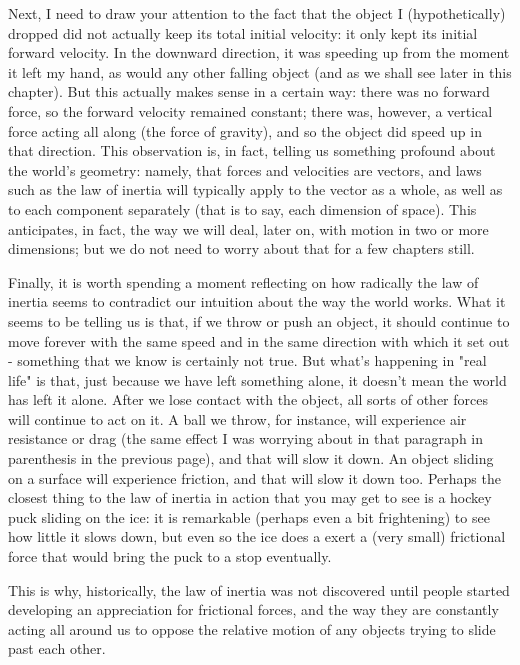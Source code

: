 \documentclass[10pt]{article}
\begin{document}
Next, I need to draw your attention to the fact that the object I (hypothetically) dropped did not actually keep its total initial velocity: it only kept its initial forward velocity. In the downward direction, it was speeding up from the moment it left my hand, as would any other falling object (and as we shall see later in this chapter). But this actually makes sense in a certain way: there was no forward force, so the forward velocity remained constant; there was, however, a vertical force acting all along (the force of gravity), and so the object did speed up in that direction. This observation is, in fact, telling us something profound about the world's geometry: namely, that forces and velocities are vectors, and laws such as the law of inertia will typically apply to the vector as a whole, as well as to each component separately (that is to say, each dimension of space). This anticipates, in fact, the way we will deal, later on, with motion in two or more dimensions; but we do not need to worry about that for a few chapters still.

Finally, it is worth spending a moment reflecting on how radically the law of inertia seems to contradict our intuition about the way the world works. What it seems to be telling us is that, if we throw or push an object, it should continue to move forever with the same speed and in the same direction with which it set out - something that we know is certainly not true. But what's happening in "real life" is that, just because we have left something alone, it doesn't mean the world has left it alone. After we lose contact with the object, all sorts of other forces will continue to act on it. A ball we throw, for instance, will experience air resistance or drag (the same effect I was worrying about in that paragraph in parenthesis in the previous page), and that will slow it down. An object sliding on a surface will experience friction, and that will slow it down too. Perhaps the closest thing to the law of inertia in action that you may get to see is a hockey puck sliding on the ice: it is remarkable (perhaps even a bit frightening) to see how little it slows down, but even so the ice does a exert a (very small) frictional force that would bring the puck to a stop eventually.

This is why, historically, the law of inertia was not discovered until people started developing an appreciation for frictional forces, and the way they are constantly acting all around us to oppose the relative motion of any objects trying to slide past each other.
\end{document}
